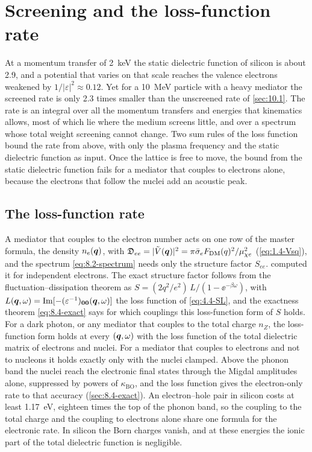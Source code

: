 \section{Screening and the loss-function rate}\label{sec:10.2}

At a momentum transfer of \SI{2}{keV} the static dielectric function of silicon is about 2.9, and a potential that varies on that scale reaches the valence electrons weakened by $1/|\varepsilon|^2 \approx 0.12$. Yet for a \SI{10}{MeV} particle with a heavy mediator the screened rate is only 2.3 times smaller than the unscreened rate of \cref{sec:10.1}. The rate is an integral over all the momentum transfers and energies that kinematics allows, most of which lie where the medium screens little, and over a spectrum whose total weight screening cannot change. Two sum rules of the loss function bound the rate from above, with only the plasma frequency and the static dielectric function as input. Once the lattice is free to move, the bound from the static dielectric function fails for a mediator that couples to electrons alone, because the electrons that follow the nuclei add an acoustic peak.

\subsection{The loss-function rate}\label{sec:10.2-rate}

A mediator that couples to the electron number acts on one row of the master formula, the density $n_e(\bm{q})$, with $\mathfrak{D}_{ee} = |\tilde V(\bm{q})|^2 = \pi\bar{\sigma}_{e}F_{\mathrm{DM}}(q)^2/\mu_{\chi e}^2$ (\cref{eq:1.4-Vsq}), and the spectrum \cref{eq:8.2-spectrum} needs only the structure factor $S_{ee}$.  computed it for independent electrons. The exact structure factor follows from the fluctuation--dissipation theorem as $S = (2q^2/e^2)\,L/(1 - \ee^{-\beta\omega})$, with $L(\bm{q},\omega) = \operatorname{Im}[-(\varepsilon^{-1})_{\bm{0}\bm{0}}(\bm{q},\omega)]$ the loss function of \cref{eq:4.4-SL}, and the exactness theorem \cref{eq:8.4-exact} says for which couplings this loss-function form of $S$ holds. For a dark photon, or any mediator that couples to the total charge $n_Z$, the loss-function form holds at every $(\bm{q},\omega)$ with the loss function of the total dielectric matrix of electrons and nuclei. For a mediator that couples to electrons and not to nucleons it holds exactly only with the nuclei clamped. Above the phonon band the nuclei reach the electronic final states through the Migdal amplitudes alone, suppressed by powers of $\kappa_{\mathrm{BO}}$, and the loss function gives the electron-only rate to that accuracy (\cref{sec:8.4-exact}). An electron--hole pair in silicon costs at least \SI{1.17}{eV}, eighteen times the top of the phonon band, so the coupling to the total charge and the coupling to electrons alone share one formula for the electronic rate. In silicon the Born charges vanish, and at these energies the ionic part of the total dielectric function is negligible.


